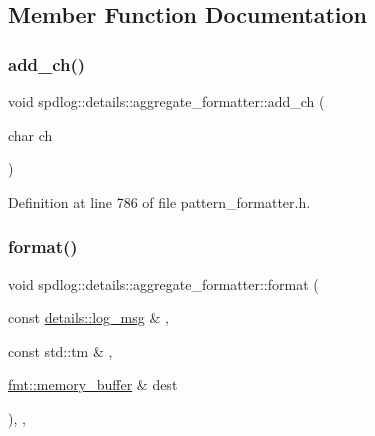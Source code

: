\subsection{Member Function Documentation}
\mbox{\label{classspdlog_1_1details_1_1aggregate__formatter_aa4a450cafac2ed6ef1fdc6dbda962ac6}} 
\subsubsection{\texorpdfstring{add\+\_\+ch()}{add\_ch()}}
{\footnotesize\ttfamily void spdlog\+::details\+::aggregate\+\_\+formatter\+::add\+\_\+ch (\begin{DoxyParamCaption}\item[{char}]{ch }\end{DoxyParamCaption})\hspace{0.3cm}{\ttfamily [inline]}}



Definition at line 786 of file pattern\+\_\+formatter.\+h.

\mbox{\label{classspdlog_1_1details_1_1aggregate__formatter_a19bcf6f721f9a3b2758a59293305987d}} 
\subsubsection{\texorpdfstring{format()}{format()}}
{\footnotesize\ttfamily void spdlog\+::details\+::aggregate\+\_\+formatter\+::format (\begin{DoxyParamCaption}\item[{const \hyperlink{structspdlog_1_1details_1_1log__msg}{details\+::log\+\_\+msg} \&}]{,  }\item[{const std\+::tm \&}]{,  }\item[{\hyperlink{format_8h_a21cbf729f69302f578e6db21c5e9e0d2}{fmt\+::memory\+\_\+buffer} \&}]{dest }\end{DoxyParamCaption})\hspace{0.3cm}{\ttfamily [inline]}, {\ttfamily [override]}, {\ttfamily [virtual]}}



